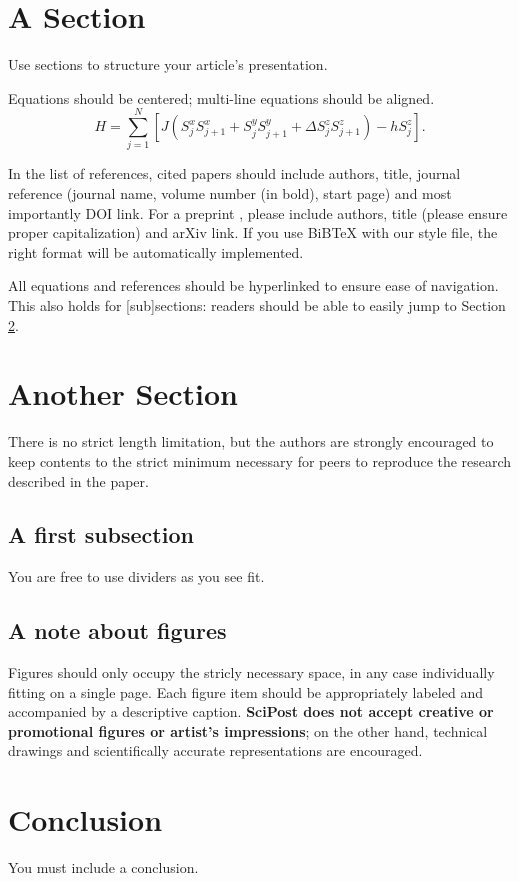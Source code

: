 \documentclass{SciPost}
\begin{document}
\section{A Section}
Use sections to structure your article's presentation. 

Equations should be centered; multi-line equations should be aligned.
\begin{equation}
H = \sum_{j=1}^N \left[J (S^x_j S^x_{j+1} + S^y_j S^y_{j+1} + \Delta S^z_j S^z_{j+1}) - h S^z_j \right].
\end{equation}

In the list of references, cited papers \cite{1931_Bethe_ZP_71} should include authors, title, journal reference (journal name, volume number (in bold), start page) and most importantly DOI link. For a preprint \cite{arXiv:1108.2700}, please include authors, title (please ensure proper capitalization) and arXiv link. If you use BiBTeX with our style file, the right format will be automatically implemented.

All equations and references should be hyperlinked to ensure ease of navigation. This also holds for [sub]sections: readers should be able to easily jump to Section \ref{sec:another}.

\section{Another Section}
\label{sec:another}
There is no strict length limitation, but the authors are strongly encouraged to keep contents to the strict minimum necessary for peers to reproduce the research described in the paper.

\subsection{A first subsection}
You are free to use dividers as you see fit.
\subsection{A note about figures}
Figures should only occupy the stricly necessary space, in any case individually fitting on a single page. Each figure item should be appropriately labeled and accompanied by a descriptive caption. {\bf SciPost does not accept creative or promotional figures or artist's impressions}; on the other hand, technical drawings and scientifically accurate representations are encouraged.


\section{Conclusion}
You must include a conclusion.
\end{document}
